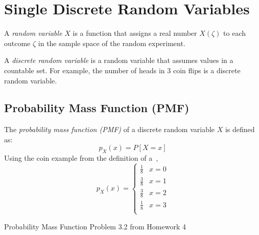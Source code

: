 \section{Single Discrete Random Variables} \label{sec:Single Discrete Random Variables}
	\begin{definition} \label{def:Random Variable, Simple}
		A \emph{random variable} $X$ is a function that assigns a real number $X \left( \zeta \right)$ to each outcome $\zeta$ in the sample space of the random experiment.
	\end{definition}
	\begin{definition} \label{def:Discrete Random Variable}
		A \emph{discrete random variable} is a random variable that assumes values in a countable set. For example, the number of heads in 3 coin flips is a discrete random variable.
	\end{definition}

	\subsection{Probability Mass Function  (PMF)} \label{subsec:Probability Mass Function}
		\begin{definition} \label{def:Probability Mass Function}
			The \emph{probability mass function (PMF)} of a discrete random variable $X$ is defined as:
			\begin{equation} \label{eq:Probability Mass Function}
				p_{X} \left( x \right) = P \left[ X=x \right]
			\end{equation}
			Using the coin example from the definition of a~,
			\begin{equation}
				p_{X} \left( x \right) = 
				\begin{cases}
					\frac{1}{8} & x=0 \\
					\frac{3}{8} & x=1 \\
					\frac{3}{8} & x=2 \\
					\frac{1}{8} & x=3 \\
				\end{cases}
			\end{equation}
		\end{definition}
		\begin{example}[Problem 3.2]{Probability Mass Function}
			Problem 3.2 from Homework 4
		\end{example}
		
